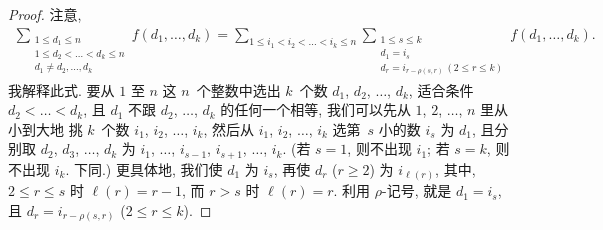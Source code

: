 \documentclass[../libro.tex]{subfiles}
\begin{document}
\begin{proof}
    注意,
    \begin{align*}
        \sum_{\substack{
                1 \leq d_1 \leq n               \\
                1 \leq d_2 < \dots < d_k \leq n \\
                d_1 \neq d_2,\dots,d_k
        }} {f(d_1, \dots, d_k)}
        =
        \sum_{1 \leq i_1 < i_2 < \dots < i_k \leq n}
        { \sum_{\substack{
                    1 \leq s \leq k \\
                    d_1 = i_s       \\
                    d_r = i_{r - \rho(s, r)}\,(2 \leq r \leq k)
            }}
        {f(d_1, \dots, d_k)}}.
    \end{align*}
    我解释此式.
    要从 \(1\) 至 \(n\) 这 \(n\)~个整数中选出 \(k\)~个数
    \(d_1\), \(d_2\), \(\dots\), \(d_k\),
    适合条件 \(d_2 < \dots < d_k\),
    且 \(d_1\) 不跟 \(d_2\), \(\dots\), \(d_k\) 的任何一个相等,
    我们可以先从
    \(1\), \(2\), \(\dots\), \(n\) 里从小到大地%
    挑 \(k\)~个数 \(i_1\), \(i_2\), \(\dots\), \(i_k\),
    然后从 \(i_1\), \(i_2\), \(\dots\), \(i_k\)
    选第~\(s\) 小的数 \(i_s\) 为 \(d_1\),
    且分别取
    \(d_2\), \(d_3\), \(\dots\), \(d_k\)
    为
    \(i_1\), \(\dots\), \(i_{s-1}\),
    \(i_{s+1}\), \(\dots\), \(i_{k}\).
    (若 \(s = 1\), 则不出现 \(i_1\); %
    若 \(s = k\), 则不出现 \(i_k\).
    下同.) %
    更具体地, 我们使 \(d_1\) 为 \(i_s\),
    再使 \(d_r\) (\(r \geq 2\)) 为 \(i_{\ell (r)}\),
    其中, \(2 \leq r \leq s\) 时 \(\ell (r) = r-1\),
    而 \(r > s\) 时 \(\ell (r) = r\).
    利用 \(\rho\)-记号, 就是 \(d_1 = i_s\),
    且 \(d_r = i_{r - \rho(s, r)}\) (\(2 \leq r \leq k\)).



\end{proof}
\end{document}
